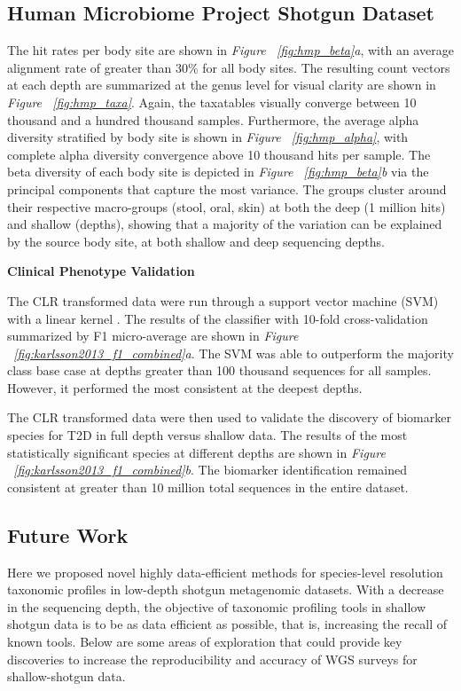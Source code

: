 \subsection{Human Microbiome Project Shotgun Dataset}

The hit rates per body site are shown in \textit{Figure ~\ref{fig:hmp_beta}a}, with an average alignment rate of greater than 30\% for all body sites. The resulting count vectors at each depth are summarized at the genus level for visual clarity are shown in \textit{Figure ~\ref{fig:hmp_taxa}}. Again, the taxatables visually converge between 10 thousand and a hundred thousand samples. Furthermore, the average alpha diversity stratified by body site is shown in \textit{Figure ~\ref{fig:hmp_alpha}}, with complete alpha diversity convergence above 10 thousand hits per sample. The beta diversity of each body site is depicted in \textit{Figure ~\ref{fig:hmp_beta}b} via the principal components that capture the most variance. The groups cluster around their respective macro-groups (stool, oral, skin) at both the deep (1 million hits) and shallow (depths), showing that a majority of the variation can be explained by the source body site, at both shallow and deep sequencing depths.

\textbf{Clinical Phenotype Validation}

The CLR transformed data were run through a support vector machine (SVM) with a linear kernel \cite{suykens_least_1999}. The results of the classifier with 10-fold cross-validation summarized by F1 micro-average are shown in \textit{Figure ~\ref{fig:karlsson2013_f1_combined}a}. The SVM was able to outperform the majority class base case at depths greater than 100 thousand sequences for all samples. However, it performed the most consistent at the deepest depths.

The CLR transformed data were then used to validate the discovery of biomarker species for T2D in full depth versus shallow data. The results of the most statistically significant species at different depths are shown in \textit{Figure ~\ref{fig:karlsson2013_f1_combined}b}. The biomarker identification remained consistent at greater than 10 million total sequences in the entire dataset.

\subsection{Future Work}

Here we proposed novel highly data-efficient methods for species-level resolution taxonomic profiles in low-depth shotgun metagenomic datasets. With a decrease in the sequencing depth, the objective of taxonomic profiling tools in shallow shotgun data is to be as data efficient as possible, that is, increasing the recall of known tools. Below are some areas of exploration that could provide key discoveries to increase the reproducibility and accuracy of WGS surveys for shallow-shotgun data.

